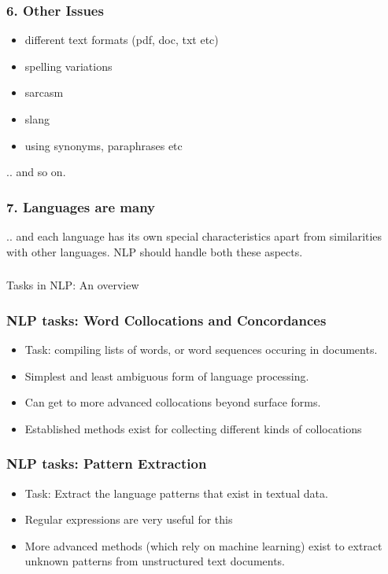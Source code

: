 \documentclass{beamer}
\begin{document}
\begin{frame}
\frametitle{6. Other Issues}
\begin{itemize}
\item different text formats (pdf, doc, txt etc)
\item spelling variations
\item sarcasm
\item slang
\item using synonyms, paraphrases etc 
\end{itemize}
.. and so on.
\end{frame}

\begin{frame}
\frametitle{7. Languages are many}
.. and each language has its own special characteristics apart from similarities with other languages. NLP should handle both these aspects. 
\end{frame}

\begin{frame}
\frametitle{}
\Large Tasks in NLP: An overview
\end{frame}


\begin{frame}
\frametitle{NLP tasks: Word Collocations and Concordances}
\begin{itemize}
\item Task: compiling lists of words, or word sequences occuring in documents.
\item Simplest and least ambiguous form of language processing. 
\item Can get to more advanced collocations beyond surface forms.
\item Established methods exist for collecting different kinds of collocations
\end{itemize}
\end{frame}

\begin{frame}
\frametitle{NLP tasks: Pattern Extraction}
\begin{itemize}
\item Task: Extract the language patterns that exist in textual data. 
\item Regular expressions are very useful for this
\item More advanced methods (which rely on machine learning) exist to extract unknown patterns from unstructured text documents.
\end{itemize}
\end{frame}
\end{document}
